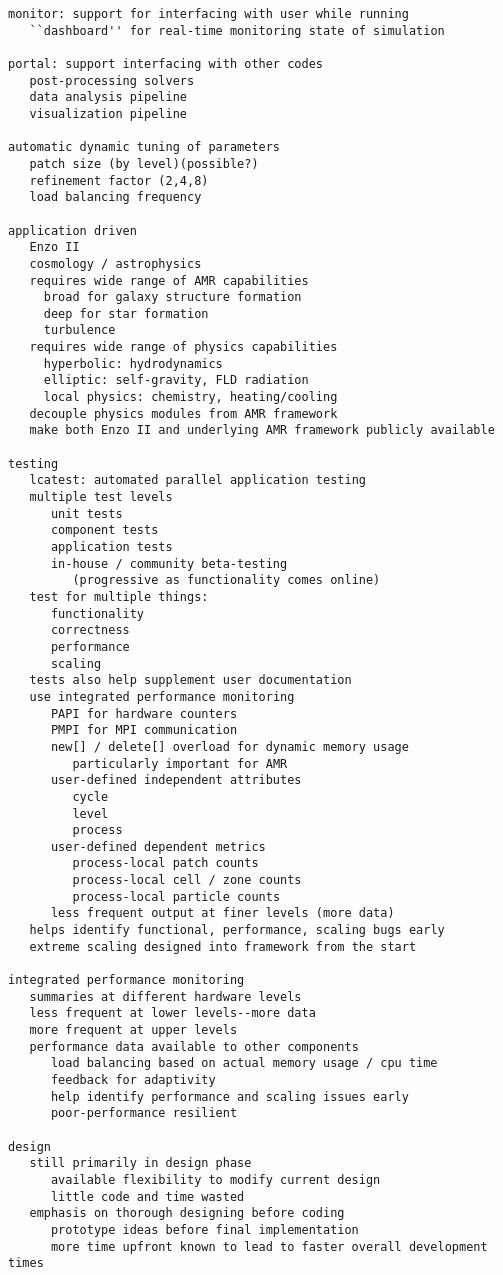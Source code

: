 \documentclass[14pt]{article}
\begin{document}
\begin{verbatim}
monitor: support for interfacing with user while running
   ``dashboard'' for real-time monitoring state of simulation
   
portal: support interfacing with other codes
   post-processing solvers
   data analysis pipeline
   visualization pipeline

automatic dynamic tuning of parameters
   patch size (by level)(possible?)
   refinement factor (2,4,8)
   load balancing frequency

application driven
   Enzo II
   cosmology / astrophysics
   requires wide range of AMR capabilities
     broad for galaxy structure formation
     deep for star formation
     turbulence
   requires wide range of physics capabilities
     hyperbolic: hydrodynamics
     elliptic: self-gravity, FLD radiation
     local physics: chemistry, heating/cooling
   decouple physics modules from AMR framework
   make both Enzo II and underlying AMR framework publicly available

testing
   lcatest: automated parallel application testing
   multiple test levels
      unit tests
      component tests
      application tests
      in-house / community beta-testing
         (progressive as functionality comes online)
   test for multiple things:
      functionality
      correctness
      performance
      scaling
   tests also help supplement user documentation
   use integrated performance monitoring
      PAPI for hardware counters
      PMPI for MPI communication
      new[] / delete[] overload for dynamic memory usage
         particularly important for AMR
      user-defined independent attributes
         cycle
         level
         process
      user-defined dependent metrics
         process-local patch counts
         process-local cell / zone counts
         process-local particle counts
      less frequent output at finer levels (more data)
   helps identify functional, performance, scaling bugs early
   extreme scaling designed into framework from the start

integrated performance monitoring
   summaries at different hardware levels
   less frequent at lower levels--more data
   more frequent at upper levels
   performance data available to other components
      load balancing based on actual memory usage / cpu time
      feedback for adaptivity
      help identify performance and scaling issues early
      poor-performance resilient

design
   still primarily in design phase
      available flexibility to modify current design
      little code and time wasted
   emphasis on thorough designing before coding
      prototype ideas before final implementation
      more time upfront known to lead to faster overall development times


\end{verbatim}
\end{document}
